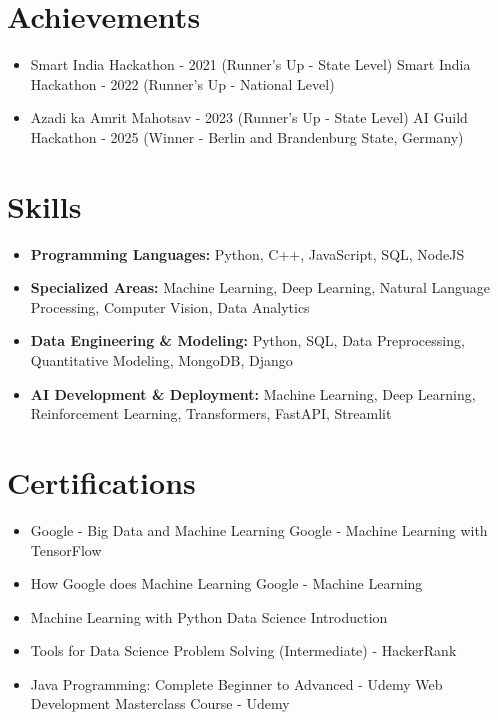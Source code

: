 \documentclass[a4paper,10pt]{article}
\begin{document}
\section*{Achievements}
\begin{itemize}
\item Smart India Hackathon - 2021 (Runner's Up - State Level) \hfill Smart India Hackathon - 2022 (Runner's Up - National Level)
\item Azadi ka Amrit Mahotsav - 2023 (Runner's Up - State Level) \hfill AI Guild Hackathon - 2025 (Winner - Berlin and Brandenburg State, Germany)
\end{itemize}

\section*{Skills}
\begin{itemize}
  \item \textbf{Programming Languages:} Python, C++, JavaScript, SQL, NodeJS
  \item \textbf{Specialized Areas:} Machine Learning, Deep Learning, Natural Language Processing, Computer Vision, Data Analytics
  \item \textbf{Data Engineering \& Modeling:} Python, SQL, Data Preprocessing, Quantitative Modeling, MongoDB, Django
  \item \textbf{AI Development \& Deployment:} Machine Learning, Deep Learning, Reinforcement Learning, Transformers, FastAPI, Streamlit
\end{itemize}

\section*{Certifications}
\begin{itemize}
\item Google - Big Data and Machine Learning \hfill Google - Machine Learning with TensorFlow
\item How Google does Machine Learning \hfill Google - Machine Learning
\item Machine Learning with Python \hfill Data Science Introduction
\item Tools for Data Science \hfill Problem Solving (Intermediate) - HackerRank
\item Java Programming: Complete Beginner to Advanced - Udemy \hfill Web Development Masterclass Course - Udemy
\end{itemize}
\end{document}
